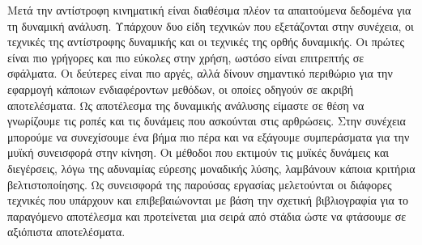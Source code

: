 Μετά την αντίστροφη κινηματική είναι διαθέσιμα πλέον τα απαιτούμενα δεδομένα για τη δυναμική ανάλυση. Υπάρχουν δυο είδη τεχνικών που εξετάζονται στην συνέχεια, οι τεχνικές της αντίστροφης δυναμικής και οι τεχνικές της ορθής δυναμικής. Οι πρώτες είναι πιο γρήγορες και πιο εύκολες στην χρήση, ωστόσο είναι επιτρεπτής σε σφάλματα. Οι δεύτερες είναι πιο αργές, αλλά δίνουν σημαντικό περιθώριο για την εφαρμογή κάποιων ενδιαφέροντων μεθόδων, οι οποίες οδηγούν σε ακριβή αποτελέσματα. Ως αποτέλεσμα της δυναμικής ανάλυσης είμαστε σε θέση να γνωρίζουμε τις ροπές και τις δυνάμεις που ασκούνται στις αρθρώσεις. Στην συνέχεια μπορούμε να συνεχίσουμε ένα βήμα πιο πέρα και να εξάγουμε συμπεράσματα για την μυϊκή συνεισφορά στην κίνηση. Οι μέθοδοι που εκτιμούν τις μυϊκές δυνάμεις και διεγέρσεις, λόγω της αδυναμίας εύρεσης μοναδικής λύσης, λαμβάνουν κάποια κριτήρια βελτιστοποίησης. Ως συνεισφορά της παρούσας εργασίας μελετούνται οι διάφορες τεχνικές που υπάρχουν και επιβεβαιώνονται με βάση την σχετική βιβλιογραφία για το παραγόμενο αποτέλεσμα και προτείνεται μια σειρά από στάδια ώστε να φτάσουμε σε αξιόπιστα αποτελέσματα.

